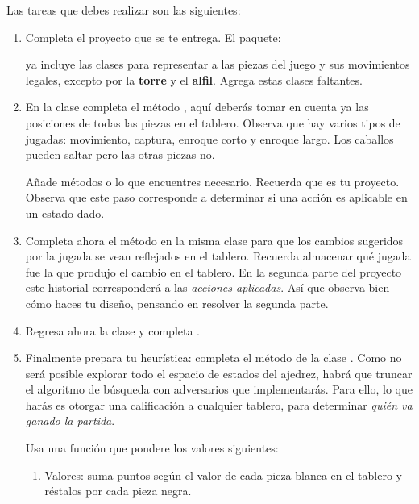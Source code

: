 Las tareas que debes realizar son las siguientes:
\begin{enumerate}
\subsubsection{Parte I: Reglas del ajedrez}
 \item Completa el proyecto que se te entrega.  El paquete:
\begin{center}
\end{center}
  ya incluye las clases para representar a las piezas del juego y sus movimientos legales, excepto por la \textbf{torre} y el \textbf{alfil}.  Agrega estas clases faltantes.

 \item En la clase  completa el método , aquí deberás tomar en cuenta ya las posiciones de todas las piezas en el tablero.  Observa que hay varios tipos de jugadas: movimiento, captura, enroque corto y enroque largo. Los caballos pueden saltar pero las otras piezas no.

 Añade métodos o lo que encuentres necesario.  Recuerda que es tu proyecto.  Observa que este paso corresponde a determinar si una acción es aplicable en un estado dado.

 \item Completa ahora el método  en la misma clase para que los cambios sugeridos por la jugada se vean reflejados en el tablero.  Recuerda almacenar qué jugada fue la que produjo el cambio en el tablero.  En la segunda parte del proyecto este historial corresponderá a las \emph{acciones aplicadas}.  Así que observa bien cómo haces tu diseño, pensando en resolver la segunda parte.

 \item Regresa ahora la clase  y completa .

 \item Finalmente prepara tu heurística: completa el método  de la clase .  Como no será posible explorar todo el espacio de estados del ajedrez, habrá que truncar el algoritmo de búsqueda con adversarios que implementarás.  Para ello, lo que harás es otorgar una calificación a cualquier tablero, para determinar \textit{quién va ganado la partida}.

 Usa una función que pondere los valores siguientes:
 \begin{enumerate}
  \item Valores: suma puntos según el valor de cada pieza blanca en el tablero y réstalos por cada pieza negra.


\end{enumerate}
\end{enumerate}
